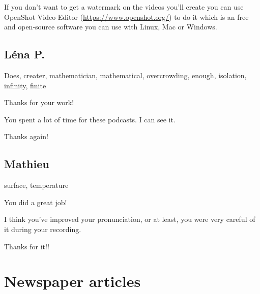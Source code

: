 \documentclass[12pt,oneside]{report}
\begin{document}
\begin{spacing}{1.2}
If you don't want to get a watermark on the videos you'll create you can use OpenShot Video Editor (\url{https://www.openshot.org/}) to do it which is an free and open-source software you can use with Linux, Mac or Windows.
\color{black}

\subsection*{Léna P.}

Does, creater, mathematician, mathematical, overcrowding, enough, isolation, infinity, finite

\color{blue}
Thanks for your work!

You spent a lot of time for these podcasts. I can see it.

Thanks again!
\color{black}

\subsection*{Mathieu}

surface, temperature

\color{blue}
You did a great job!

I think you've improved your pronunciation, or at least, you were very careful of it during your recording.

Thanks for it!!
\color{black}


\section{Newspaper articles}





\end{spacing}
\end{document}
